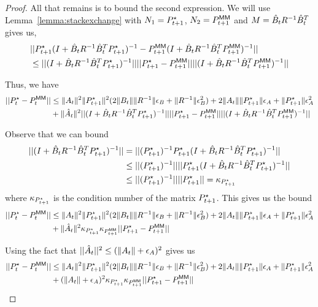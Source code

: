 \begin{proof}
All that remains is to bound the second expression. We will use
Lemma~\ref{lemma:stackexchange} with $N_{1} = P^\star_{t+1}$, $N_{2} = P^\mathsf{MM}_{t+1}$ and
$M = \hat{B}_t R^{{-1}}\hat{B}_t^{T}$ gives us,
\begin{align*}
  &||P^\star_{t+1}(I + \hat{B}_t R^{-1}\hat{B}_t^{T}P^\star_{t+1})^{{-1}} - P^\mathsf{MM}_{t+1}(I + \hat{B}_t R^{-1}\hat{B}_t^{T}P^\mathsf{MM}_{t+1})^{{-1}}|| \\
  &\leq ||(I + \hat{B}_t R^{{-1}}\hat{B}_t^{T}P^\star_{t+1})^{-1}|| ||P^\star_{t+1} - P^\mathsf{MM}_{{t+1}}|| ||(I + \hat{B}_t R^{{-1}}\hat{B}_t^{T}P^\mathsf{MM}_{t+1})^{-1}||
\end{align*}

Thus, we have
\begin{align*}
  ||P^\star_{t} - P^\mathsf{MM}_{t}|| &\leq  \|A_t\|^{2}\|P^\star_{t+1}\|^{2}(2\|B_t\|\|R^{-1}\|\epsilon_B + \|R^{-1}\|\epsilon_B^{2}) + 2\|A_t\|\|P^\star_{t+1}\|\epsilon_A + \|P^\star_{t+1}\|\epsilon_A^{2} \\
  &+ \|\hat{A}_t\|^{2}||(I + \hat{B}_t R^{{-1}}\hat{B}_t^{T}P^\star_{t+1})^{-1}|| ||P^\star_{t+1} - P^\mathsf{MM}_{{t+1}}|| ||(I + \hat{B}_t R^{{-1}}\hat{B}_t^{T}P^\mathsf{MM}_{t+1})^{-1}||
\end{align*}

Observe that we can bound
\begin{align*}
  ||(I + \hat{B}_t R^{{-1}}\hat{B}_t^{T}P^\star_{t+1})^{-1}|| &= ||(P^\star_{t+1})^{-1}P^\star_{t+1}(I + \hat{B}_t R^{{-1}}\hat{B}_t^{T}P^\star_{t+1})^{-1}|| \\
                                                &\leq ||(P^\star_{t+1})^{-1}|| ||P^\star_{t+1}(I + \hat{B}_t R^{{-1}}\hat{B}_t^{T}P^\star_{t+1})^{-1}|| \\
  &\leq ||(P^\star_{t+1})^{-1}|| ||P^\star_{t+1}|| = \kappa_{P^\star_{t+1}}
\end{align*}
where $\kappa_{P^\star_{t+1}}$ is the condition number of the matrix $P^\star_{t+1}$. This
gives us the bound
\begin{align*}
  ||P^\star_{t} - P^\mathsf{MM}_{t}|| &\leq  \|A_t\|^{2}\|P^\star_{t+1}\|^{2}(2\|B_t\|\|R^{-1}\|\epsilon_B + \|R^{-1}\|\epsilon_B^{2}) + 2\|A_t\|\|P^\star_{t+1}\|\epsilon_A + \|P^\star_{t+1}\|\epsilon_A^{2} \\
                        &+
                          \|\hat{A}_t\|^{2}\kappa_{P^\star_{t+1}}\kappa_{P^\mathsf{MM}_{t+1}}
                          ||P^\star_{t+1} - P^\mathsf{MM}_{{t+1}}||
\end{align*}

Using the fact that
$||\hat{A}_t||^{2} \leq (\|A_t\| + \epsilon_A)^2$ gives us
\begin{align}
  \label{eq:92}
  ||P^\star_{t} - P^\mathsf{MM}_{t}|| &\leq  \|A_t\|^{2}\|P^\star_{t+1}\|^{2}(2\|B_t\|\|R^{-1}\|\epsilon_B + \|R^{-1}\|\epsilon_B^{2}) + 2\|A_t\|\|P^\star_{t+1}\|\epsilon_A + \|P^\star_{t+1}\|\epsilon_A^{2} \nonumber\\
                        &+ (\|A_t\| +  \epsilon_A)^2\kappa_{P^\star_{t+1}}\kappa_{P^\mathsf{MM}_{t+1}} ||P^\star_{t+1} - P^\mathsf{MM}_{{t+1}}||
\end{align}


\end{proof}
